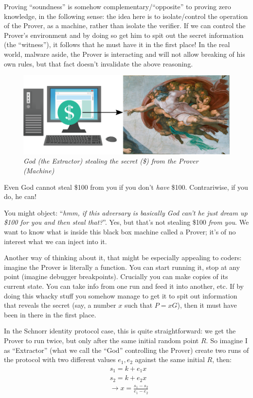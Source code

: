 \documentclass[10pt,a4paper]{article}
\begin{document}
Proving ``soundness'' is somehow complementary/``opposite'' to proving
zero knowledge, in the following sense: the idea here is to
isolate/control the operation of the Prover, as a machine, rather than
isolate the verifier. If we can control the Prover's environment and by
doing so get him to spit out the secret information (the ``witness''),
it follows that he must have it in the first place! In the real world,
malware aside, the Prover is interacting and will not allow breaking of
his own rules, but that fact doesn't invalidate the above reasoning.

\begin{figure}[h]
\raggedright
\includegraphics[scale=0.5]{images/extractorgod5.png}
\caption{\emph{God (the Extractor) stealing the secret (\$) from the Prover (Machine)}}
\end{figure}

Even God cannot steal \$100 from you if you don't \emph{have} \$100.
Contrariwise, if you do, he can!

You might object: ``\emph{hmm, if this adversary is basically God can't
he just dream up \$100 for you and then steal that?}''. Yes, but that's
not stealing \$100 \emph{from you}. We want to know what is inside this
black box machine called a Prover; it's of no interest what we can
inject into it.

Another way of thinking about it, that might be especially appealing to
coders: imagine the Prover is literally a function. You can start
running it, stop at any point (imagine debugger breakpoints). Crucially
you can make copies of its current state. You can take info from one run
and feed it into another, etc. If by doing this whacky stuff you somehow
manage to get it to spit out information that reveals the secret (say, a
number $x$ such that $P=xG$), then it must have been in there in the first place.

In the Schnorr identity protocol case, this is quite straightforward: we
get the Prover to run twice, but only after the same initial random
point $R$. So imagine I as ``Extractor'' (what we call the ``God''
controlling the Prover) create two runs of the protocol with two
different values $e_1, e_2$ against the same initial $R$, then:
\begin{align*}
&s_1 = k + e_{1}x \\
&s_2 = k + e_{2}x \\
& \rightarrow x = \frac{s_1 - s_2}{e_1 - e_2} \\
\end{align*}
\end{document}
